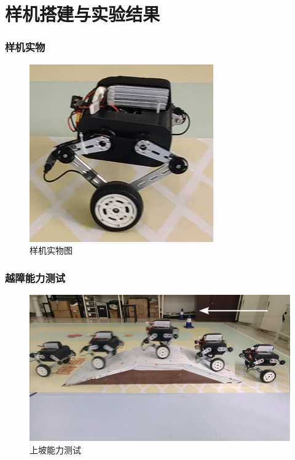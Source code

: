 \documentclass{beamer}
\begin{document}
	
	
	\section[样机搭建与实验结果]{样机搭建与实验结果}
	
	\begin{frame}
		\frametitle{样机实物}
		\begin{figure}
			\centering
			\includegraphics[width=0.5\linewidth]{img/chapter6/model}
			\captionsetup{font=scriptsize}
			\vspace{5pt}
			\caption{样机实物图}
		\end{figure}
	\end{frame}
	
	\begin{frame}
		\frametitle{越障能力测试}
		\begin{figure}
			\centering
			\includegraphics[width=0.9\linewidth]{img/chapter6/1.pdf}
			\captionsetup{font=scriptsize}
			\vspace{5pt}
			\caption{上坡能力测试}
		\end{figure}
	\end{frame}
	
\end{document}
